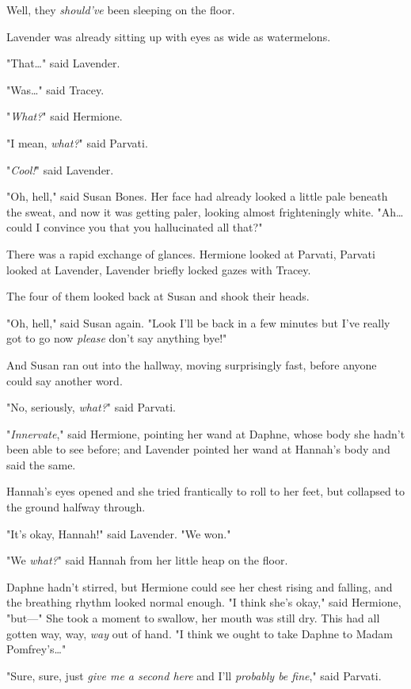 Well, they \emph{should've} been sleeping on the floor.

Lavender was already sitting up with eyes as wide as watermelons.

"That{\ldots}" said Lavender.

"Was{\ldots}" said Tracey.

"\emph{What?}" said Hermione.

"I mean,\emph{ what?}" said Parvati.

"\emph{Cool!}" said Lavender.

"Oh, hell," said Susan Bones. Her face had already looked a little pale beneath 
the sweat, and now it was getting paler, looking almost frighteningly white. 
"Ah{\ldots} could I convince you that you hallucinated all that?"

There was a rapid exchange of glances. Hermione looked at Parvati, Parvati 
looked at Lavender, Lavender briefly locked gazes with Tracey.

The four of them looked back at Susan and shook their heads.

"Oh, hell," said Susan again. "Look I'll be back in a few minutes but I've 
really got to go now \emph{please} don't say anything bye!"

And Susan ran out into the hallway, moving surprisingly fast, before anyone 
could say another word.

"No, seriously, \emph{what?}" said Parvati.

"\emph{Innervate}," said Hermione, pointing her wand at Daphne, whose body she 
hadn't been able to see before; and Lavender pointed her wand at Hannah's body 
and said the same.

Hannah's eyes opened and she tried frantically to roll to her feet, but 
collapsed to the ground halfway through.

"It's okay, Hannah!" said Lavender. "We won."

"We \emph{what?}" said Hannah from her little heap on the floor.

Daphne hadn't stirred, but Hermione could see her chest rising and falling, and 
the breathing rhythm looked normal enough. "I think she's okay," said Hermione, 
"but---" She took a moment to swallow, her mouth was still dry. This had all 
gotten way, way, \emph{way} out of hand. "I think we ought to take Daphne to 
Madam Pomfrey's{\ldots}"

"Sure, sure, just \emph{give me a second here} and I'll \emph{probably be 
fine}," said Parvati.

